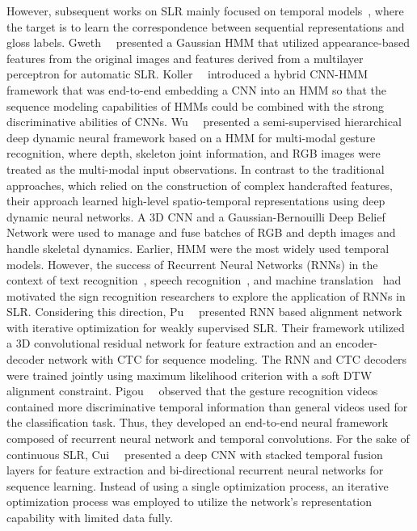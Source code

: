 \documentclass[journal]{IEEEtran}
\begin{document}
However, subsequent works on SLR mainly focused on temporal models~\cite{gweth2012enhanced, koller2016deeps, wu2016deep,pigou2018beyond, cui2019deep}, where the target is to learn the correspondence between sequential representations and gloss labels. Gweth~\etal~\cite{gweth2012enhanced} presented a Gaussian HMM that utilized appearance-based features from the original images and features derived from a multilayer perceptron for automatic SLR. Koller~\etal~\cite{koller2016deeps} introduced a hybrid CNN-HMM framework that was end-to-end embedding a CNN into an HMM so that the sequence modeling capabilities of HMMs could be combined with the strong discriminative abilities of CNNs. Wu~\etal~\cite{wu2016deep} presented a semi-supervised hierarchical deep dynamic neural framework based on a HMM for multi-modal gesture recognition, where depth, skeleton joint information, and RGB images were treated as the multi-modal input observations. In contrast to the traditional approaches, which relied on the construction of complex handcrafted features, their approach learned high-level spatio-temporal representations using deep dynamic neural networks. A 3D CNN and a Gaussian-Bernouilli Deep Belief Network were used to manage and fuse batches of RGB and depth images and handle skeletal dynamics. Earlier, HMM were the most widely used temporal models. However, the success of  Recurrent Neural Networks (RNNs) in the context of text recognition~\cite{cheng2017focusing, cheng2018aon, li2019show}, speech recognition~\cite{graves2014towards}, and machine translation~\cite{bahdanau2014neural, sutskever2014sequence} had motivated the sign recognition researchers to explore the application of RNNs in SLR. Considering this direction, Pu~\etal~\cite{pu2019iterative} presented RNN based alignment network with iterative optimization for weakly supervised SLR. Their framework utilized a 3D convolutional residual network for feature extraction and an encoder-decoder network with CTC for sequence modeling. The RNN and CTC decoders were trained jointly using maximum likelihood criterion with a soft DTW alignment constraint. Pigou~\etal~\cite{pigou2018beyond} observed that the gesture recognition videos contained more discriminative temporal information than general videos used for the classification task. Thus, they developed  an end-to-end neural framework composed of recurrent neural network and temporal convolutions. For the sake of continuous SLR, Cui~\etal~\cite{cui2019deep} presented a deep CNN with stacked temporal fusion layers for feature extraction and bi-directional recurrent neural networks for sequence learning. Instead of using a single optimization process, an iterative optimization process was employed to utilize the network's representation capability with limited data fully.
\end{document}
